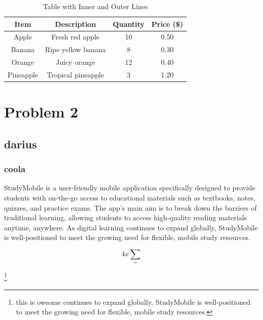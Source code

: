 \documentclass[12pt]{article}
\begin{document}
	\newpage
		\begin{table}[ht]
			\centering
			\caption{Table with Inner and Outer Lines} %
			\vspace{0.5em} %
			\begin{tabular}{|c|c|c|c|} %
				\hline
				\textbf{Item} & \textbf{Description} & \textbf{Quantity} & \textbf{Price (\$)} \\ 
				\hline
				Apple & Fresh red apple & 10 & 0.50 \\ 
				\hline
				Banana & Ripe yellow banana & 8 & 0.30 \\ 
				\hline
				Orange & Juicy orange & 12 & 0.40 \\ 
				\hline
				Pineapple & Tropical pineapple & 3 & 1.20 \\ 
				\hline
			\end{tabular}
			\label{tab:lined_table}
		\end{table}
		
		
		\section {Problem 2}
		
		
		\subsection{darius }
		\subsubsection{coola}
	
      
		
		StudyMobile is a user-friendly mobile application specifically designed to provide students with on-the-go access to educational materials such as textbooks, notes, quizzes, and practice exams. The app’s main aim is to break down the barriers of traditional learning, allowing students to access high-quality reading materials anytime, anywhere. As digital learning continues to expand globally, StudyMobile is well-positioned to meet the growing need for flexible, mobile study resources.
	    
	    
	   	$$4x{\sum }_{=}$$
	   	
	   
	   	
	
       \footnote{this is owsome continues to expand globally, StudyMobile is well-positioned to meet the growing need for flexible, mobile study resources.}
       \newpage
       
   
   	

   	
       
	
\end{document}
